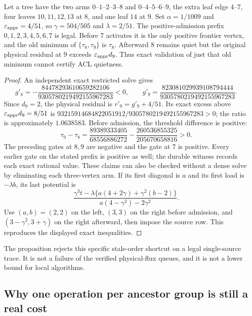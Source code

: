 \begin{proposition}
\label{prop:op3-tree-stale-minimum-acl}
Let a tree have the two arms $0$--$1$--$2$--$3$--$8$ and
$0$--$4$--$5$--$6$--$9$, the extra leaf edge $4$--$7$, four leaves
$10,11,12,13$ at $8$, and one leaf $14$ at $9$.
Set $\alpha=1/1009$ and $\varepsilon_{\mathrm{appr}}=4/51$, so
$\gamma=504/505$ and $\lambda=2/51$.
The positive-admission prefix $0,1,2,3,4,5,6,7$ is legal. Before $7$
activates it is the only positive frontier vertex, and the old minimum of
$\{\tau_8,\tau_9\}$ is $\tau_8$. Afterward $8$ remains quiet but the
original physical residual at $9$ exceeds $\varepsilon_{\mathrm{appr}} d_9$.
Thus exact validation of just that old minimum cannot certify ACL quietness.
\end{proposition}
\begin{proof}
An independent exact restricted solve gives
\[
 g'_8=-\frac{84478293610659282106}{9305780219492155967283}<0,
 \qquad
 g'_9=\frac{823081029939108794444}{9305780219492155967283}.
\]
Since $d_9=2$, the physical residual is $r'_9=g'_9+4/51$.
Its exact excess above $\varepsilon_{\mathrm{appr}} d_9=8/51$ is
$93215914684822051912/9305780219492155967283>0$; the ratio is approximately
$1.0638583$. Before admission, the threshold difference is positive:
\[
 \tau_9-\tau_8
 =\frac{89389333405}{68556886272}
  -\frac{260536855325}{205670658816}>0.
\]
The preceding gates at $8,9$ are negative and the gate at $7$ is positive.
Every earlier gate on the stated prefix is positive as well; the durable
witness records each exact rational value. These claims can also be checked
without a dense solve by eliminating each three-vertex arm. If its first
diagonal is $a$ and its first load is $-\lambda b$, its last potential is
\[
 \frac{\gamma^3t-\lambda\{a(4+2\gamma)+\gamma^2(b-2)\}}
 {a(4-\gamma^2)-2\gamma^2}.
\]
Use $(a,b)=(2,2)$ on the left, $(3,3)$ on the right before admission,
and $(3-\gamma^2,3+\gamma)$ on the right afterward, then impose the source
row. This reproduces the displayed exact inequalities.
\end{proof}

The proposition rejects this specific stale-order shortcut on a legal
single-source trace. It is not a failure of the verified physical-flux
queues, and it is not a lower bound for local algorithms.

\subsection{Why one operation per ancestor group is still a real cost}

